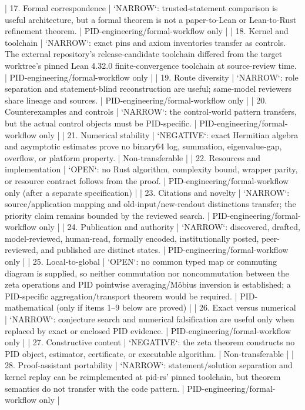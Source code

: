 \documentclass[11pt]{article}
\begin{document}
\begin{markdown}
| 17. Formal correspondence | `NARROW`: trusted-statement comparison is useful architecture, but a formal theorem is not a paper-to-Lean or Lean-to-Rust refinement theorem. | PID-engineering/formal-workflow only |
| 18. Kernel and toolchain | `NARROW`: exact pins and axiom inventories transfer as controls. The external repository's release-candidate toolchain differed from the target worktree's pinned Lean 4.32.0 finite-convergence toolchain at source-review time. | PID-engineering/formal-workflow only |
| 19. Route diversity | `NARROW`: role separation and statement-blind reconstruction are useful; same-model reviewers share lineage and sources. | PID-engineering/formal-workflow only |
| 20. Counterexamples and controls | `NARROW`: the control-world pattern transfers, but the actual control objects must be PID-specific. | PID-engineering/formal-workflow only |
| 21. Numerical stability | `NEGATIVE`: exact Hermitian algebra and asymptotic estimates prove no binary64 log, summation, eigenvalue-gap, overflow, or platform property. | Non-transferable |
| 22. Resources and implementation | `OPEN`: no Rust algorithm, complexity bound, wrapper parity, or resource contract follows from the proof. | PID-engineering/formal-workflow only (after a separate specification) |
| 23. Citations and novelty | `NARROW`: source/application mapping and old-input/new-readout distinctions transfer; the priority claim remains bounded by the reviewed search. | PID-engineering/formal-workflow only |
| 24. Publication and authority | `NARROW`: discovered, drafted, model-reviewed, human-read, formally encoded, institutionally posted, peer-reviewed, and published are distinct states. | PID-engineering/formal-workflow only |
| 25. Local-to-global | `OPEN`: no common typed map or commuting diagram is supplied, so neither commutation nor noncommutation between the zeta operations and PID pointwise averaging/Möbius inversion is established; a PID-specific aggregation/transport theorem would be required. | PID-mathematical (only if items 1--9 below are proved) |
| 26. Exact versus numerical | `NARROW`: conjecture search and numerical falsification are useful only when replaced by exact or enclosed PID evidence. | PID-engineering/formal-workflow only |
| 27. Constructive content | `NEGATIVE`: the zeta theorem constructs no PID object, estimator, certificate, or executable algorithm. | Non-transferable |
| 28. Proof-assistant portability | `NARROW`: statement/solution separation and kernel replay can be reimplemented at pid-rs' pinned toolchain, but theorem semantics do not transfer with the code pattern. | PID-engineering/formal-workflow only |

\end{markdown}
\end{document}
